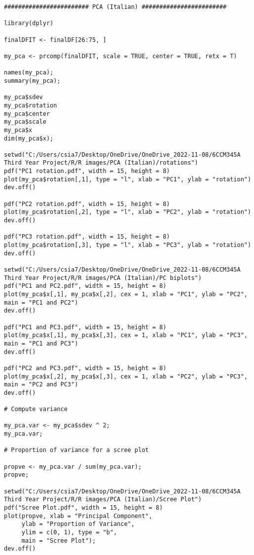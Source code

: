 \begin{verbatim}
######################## PCA (Italian) ########################

library(dplyr)

finalDFIT <- finalDF[26:75, ]

my_pca <- prcomp(finalDFIT, scale = TRUE, center = TRUE, retx = T)

names(my_pca);
summary(my_pca);

my_pca$sdev
my_pca$rotation
my_pca$center
my_pca$scale
my_pca$x
dim(my_pca$x);

setwd("C:/Users/csia7/Desktop/OneDrive/OneDrive_2022-11-08/6CCM345A Third Year Project/R/R images/PCA (Italian)/rotations")
pdf("PC1 rotation.pdf", width = 15, height = 8) 
plot(my_pca$rotation[,1], type = "l", xlab = "PC1", ylab = "rotation")
dev.off()

pdf("PC2 rotation.pdf", width = 15, height = 8) 
plot(my_pca$rotation[,2], type = "l", xlab = "PC2", ylab = "rotation")
dev.off()

pdf("PC3 rotation.pdf", width = 15, height = 8) 
plot(my_pca$rotation[,3], type = "l", xlab = "PC3", ylab = "rotation")
dev.off()

setwd("C:/Users/csia7/Desktop/OneDrive/OneDrive_2022-11-08/6CCM345A Third Year Project/R/R images/PCA (Italian)/PC biplots")
pdf("PC1 and PC2.pdf", width = 15, height = 8) 
plot(my_pca$x[,1], my_pca$x[,2], cex = 1, xlab = "PC1", ylab = "PC2", main = "PC1 and PC2")
dev.off()

pdf("PC1 and PC3.pdf", width = 15, height = 8) 
plot(my_pca$x[,1], my_pca$x[,3], cex = 1, xlab = "PC1", ylab = "PC3", main = "PC1 and PC3")
dev.off()

pdf("PC2 and PC3.pdf", width = 15, height = 8) 
plot(my_pca$x[,2], my_pca$x[,3], cex = 1, xlab = "PC2", ylab = "PC3", main = "PC2 and PC3")
dev.off()

# Compute variance

my_pca.var <- my_pca$sdev ^ 2;
my_pca.var;

# Proportion of variance for a scree plot

propve <- my_pca.var / sum(my_pca.var);
propve;

setwd("C:/Users/csia7/Desktop/OneDrive/OneDrive_2022-11-08/6CCM345A Third Year Project/R/R images/PCA (Italian)/Scree Plot")
pdf("Scree Plot.pdf", width = 15, height = 8) 
plot(propve, xlab = "Principal Component",
     ylab = "Proportion of Variance",
     ylim = c(0, 1), type = "b",
     main = "Scree Plot");
dev.off()


\end{verbatim}
